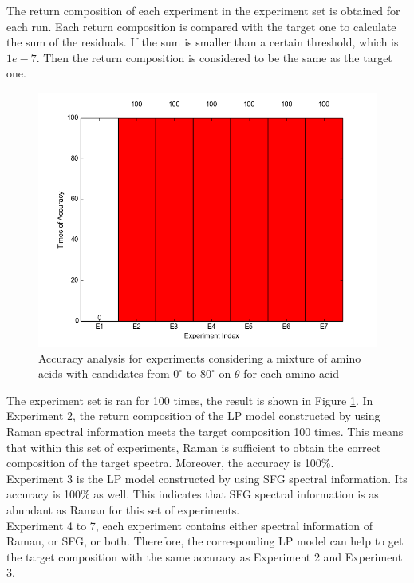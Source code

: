 The return composition of each experiment in the experiment set is obtained for each run. Each return composition is compared with the target one to calculate the sum of the residuals. If the sum is smaller than a certain threshold, which is $1e-7$. Then the return composition is considered to be the same as the target one. \\

\begin{figure}[!ht]
\centering
\includegraphics[scale=0.7]{Figures/accuracy_pecent_result8_mixture.png}
\caption{Accuracy analysis for experiments considering a mixture of amino acids with candidates from $0^{\circ}$ to $80^{\circ}$ on $\theta$ for each amino acid}  \label{fig:5.1}
\end{figure}

The experiment set is ran for 100 times, the result is shown in 
Figure \ref{fig:5.1}. In Experiment 2, the return composition of the LP model constructed by using Raman spectral information meets the target composition 100 times. This means that within this set of experiments, Raman is sufficient to obtain the correct composition of the target spectra. Moreover, the accuracy is 100\%. \\

Experiment 3 is the LP model constructed by using SFG spectral information. Its accuracy is 100\% as well. This indicates that SFG spectral information is as abundant as Raman for this set of experiments. \\

Experiment 4 to 7, each experiment contains either spectral information of Raman, or SFG, or both. Therefore, the corresponding LP model can help to get the target composition with the same accuracy as Experiment 2 and Experiment 3. \\

